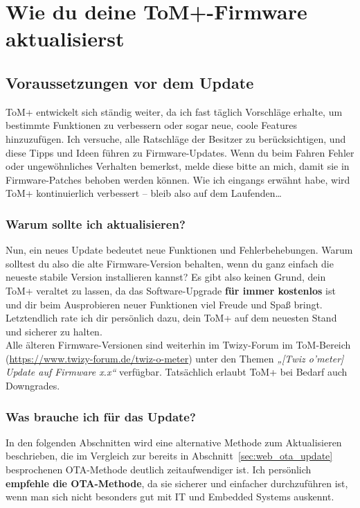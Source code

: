\chapter{Wie du deine ToM+-Firmware aktualisierst}
\label{sec:update_procedure}

\section{Voraussetzungen vor dem Update}

ToM+ entwickelt sich ständig weiter, da ich fast täglich Vorschläge erhalte, um bestimmte Funktionen zu verbessern oder sogar neue, coole Features hinzuzufügen. Ich versuche, alle Ratschläge der Besitzer zu berücksichtigen, und diese Tipps und Ideen führen zu Firmware-Updates. Wenn du beim Fahren Fehler oder ungewöhnliches Verhalten bemerkst, melde diese bitte an mich, damit sie in Firmware-Patches behoben werden können. Wie ich eingangs erwähnt habe, wird ToM+ kontinuierlich verbessert – bleib also auf dem Laufenden\ldots

\subsection{Warum sollte ich aktualisieren?}

Nun, ein neues Update bedeutet neue Funktionen und Fehlerbehebungen. Warum solltest du also die alte Firmware-Version behalten, wenn du ganz einfach die neueste stabile Version installieren kannst? Es gibt also keinen Grund, dein ToM+ veraltet zu lassen, da das Software-Upgrade \textbf{für immer kostenlos} ist und dir beim Ausprobieren neuer Funktionen viel Freude und Spaß bringt. Letztendlich rate ich dir persönlich dazu, dein ToM+ auf dem neuesten Stand und sicherer zu halten.\\

Alle älteren Firmware-Versionen sind weiterhin im Twizy-Forum im ToM-Bereich (\url{https://www.twizy-forum.de/twiz-o-meter}) unter den Themen \textit{„[Twiz o'meter] Update auf Firmware x.x“} verfügbar. Tatsächlich erlaubt ToM+ bei Bedarf auch Downgrades.

\subsection{Was brauche ich für das Update?}

In den folgenden Abschnitten wird eine alternative Methode zum Aktualisieren beschrieben, die im Vergleich zur bereits in Abschnitt~\ref{sec:web_ota_update} besprochenen OTA-Methode deutlich zeitaufwendiger ist. Ich persönlich \textbf{empfehle die OTA-Methode}, da sie sicherer und einfacher durchzuführen ist, wenn man sich nicht besonders gut mit IT und Embedded Systems auskennt.\\


